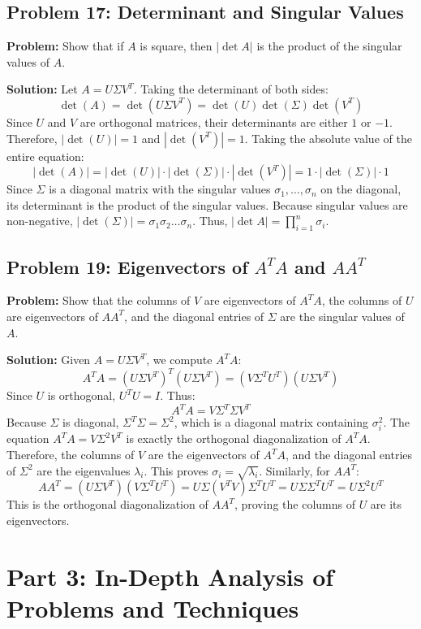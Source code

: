\documentclass[11pt, letterpaper]{article}
\theoremstyle{definition}
\theoremstyle{remark}
\begin{document}
\vspace{1em}
\subsection{Problem 17: Determinant and Singular Values}
\textbf{Problem:} Show that if $A$ is square, then $|\det A|$ is the product of the singular values of $A$.

\textbf{Solution:}
Let $A = U \Sigma V^T$. Taking the determinant of both sides:
\[
\det(A) = \det(U \Sigma V^T) = \det(U) \det(\Sigma) \det(V^T)
\]
Since $U$ and $V$ are orthogonal matrices, their determinants are either $1$ or $-1$. Therefore, $|\det(U)| = 1$ and $|\det(V^T)| = 1$.
Taking the absolute value of the entire equation:
\[
|\det(A)| = |\det(U)| \cdot |\det(\Sigma)| \cdot |\det(V^T)| = 1 \cdot |\det(\Sigma)| \cdot 1
\]
Since $\Sigma$ is a diagonal matrix with the singular values $\sigma_1, \dots, \sigma_n$ on the diagonal, its determinant is the product of the singular values. Because singular values are non-negative, $|\det(\Sigma)| = \sigma_1 \sigma_2 \dots \sigma_n$.
Thus, $|\det A| = \prod_{i=1}^n \sigma_i$.

\vspace{1em}
\subsection{Problem 19: Eigenvectors of $A^TA$ and $AA^T$}
\textbf{Problem:} Show that the columns of $V$ are eigenvectors of $A^TA$, the columns of $U$ are eigenvectors of $AA^T$, and the diagonal entries of $\Sigma$ are the singular values of $A$.

\textbf{Solution:}
Given $A = U \Sigma V^T$, we compute $A^TA$:
\[
A^TA = (U \Sigma V^T)^T (U \Sigma V^T) = (V \Sigma^T U^T) (U \Sigma V^T)
\]
Since $U$ is orthogonal, $U^T U = I$. Thus:
\[
A^TA = V \Sigma^T \Sigma V^T
\]
Because $\Sigma$ is diagonal, $\Sigma^T \Sigma = \Sigma^2$, which is a diagonal matrix containing $\sigma_i^2$. The equation $A^TA = V \Sigma^2 V^T$ is exactly the orthogonal diagonalization of $A^TA$. Therefore, the columns of $V$ are the eigenvectors of $A^TA$, and the diagonal entries of $\Sigma^2$ are the eigenvalues $\lambda_i$. This proves $\sigma_i = \sqrt{\lambda_i}$.
Similarly, for $AA^T$:
\[
AA^T = (U \Sigma V^T) (V \Sigma^T U^T) = U \Sigma (V^T V) \Sigma^T U^T = U \Sigma \Sigma^T U^T = U \Sigma^2 U^T
\]
This is the orthogonal diagonalization of $AA^T$, proving the columns of $U$ are its eigenvectors.

\newpage
\section{Part 3: In-Depth Analysis of Problems and Techniques}
\end{document}
